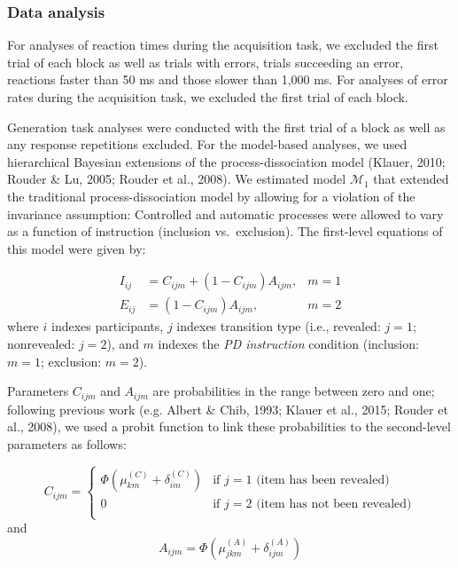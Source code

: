 \documentclass[floatsintext,doc]{apa6}
\theoremstyle{definition}
\theoremstyle{definition}
\theoremstyle{definition}
\theoremstyle{remark}
\begin{document}
\subsubsection{Data analysis}\label{data-analysis-1}

For analyses of reaction times during the acquisition task, we excluded
the first trial of each block as well as trials with errors, trials
succeeding an error, reactions faster than 50 ms and those slower than
1,000 ms. For analyses of error rates during the acquisition task, we
excluded the first trial of each block.

Generation task analyses were conducted with the first trial of a block
as well as any response repetitions excluded. For the model-based
analyses, we used hierarchical Bayesian extensions of the
process-dissociation model (Klauer, 2010; Rouder \& Lu, 2005; Rouder et
al., 2008). We estimated model \(\mathcal{M}_1\) that extended the
traditional process-dissociation model by allowing for a violation of
the invariance assumption: Controlled and automatic processes were
allowed to vary as a function of instruction (inclusion vs.~exclusion).
The first-level equations of this model were given by:

\[
\begin{aligned}
  I_{ij} & =  C_{ijm} + (1-C_{ijm}) A_{ijm},& m = 1\\
  E_{ij} & =  (1-C_{ijm}) A_{ijm},& m = 2
\end{aligned}
\] where \(i\) indexes participants, \(j\) indexes transition type
(i.e., revealed: \(j = 1\); nonrevealed: \(j = 2\)), and \(m\) indexes
the \emph{PD instruction} condition (inclusion: \(m=1\); exclusion:
\(m=2\)).

Parameters \(C_{ijm}\) and \(A_{ijm}\) are probabilities in the range
between zero and one; following previous work (e.g. Albert \& Chib,
1993; Klauer et al., 2015; Rouder et al., 2008), we used a probit
function to link these probabilities to the second-level parameters as
follows:

\[
  C_{ijm} = \begin{cases}
    \Phi(\mu_{km}^{(C)} + \delta_{im}^{(C)}) & \text{if } j=1 \text{ (item has been revealed)}\\
                                            0 & \text{if } j=2 \text{ (item has not been revealed)}\\
    \end{cases}
\] and \[
  A_{ijm} = \Phi(\mu_{jkm}^{(A)} + \delta_{ijm}^{(A)})
\]
\end{document}
